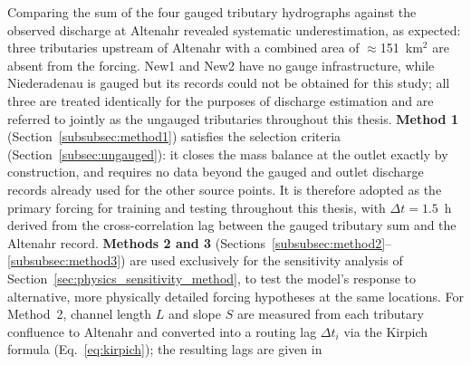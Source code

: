 \documentclass[12pt,a4paper]{report}
\begin{document}
Comparing the sum of the four gauged tributary hydrographs against the observed
discharge at Altenahr revealed systematic underestimation, as expected: three
tributaries upstream of Altenahr with a combined area of $\approx$151~km$^2$ are absent
from the forcing. New1 and New2 have no gauge infrastructure, while Niederadenau is
gauged but its records could not be obtained for this study; all three are treated
identically for the purposes of discharge estimation and are referred to jointly as the
ungauged tributaries throughout this thesis. \textbf{Method 1} (Section~\ref{subsubsec:method1}) satisfies the selection
criteria (Section~\ref{subsec:ungauged}): it closes the mass balance at the outlet
exactly by construction, and requires no data beyond the gauged and outlet discharge
records already used for the other source points. It is therefore adopted as the
primary forcing for training and testing throughout this thesis, with $\Delta t =
1.5$~h derived from the cross-correlation lag between the gauged tributary sum and the
Altenahr record. \textbf{Methods 2 and 3} (Sections~\ref{subsubsec:method2}--\ref{subsubsec:method3})
are used exclusively for the sensitivity analysis of
Section~\ref{sec:physics_sensitivity_method}, to test the
model's response to alternative, more physically detailed forcing hypotheses at the
same locations. For Method~2, channel length $L$ and slope $S$ are measured from each
tributary confluence to Altenahr and converted into a routing lag $\Delta t_i$ via the
Kirpich formula (Eq.~\ref{eq:kirpich}); the resulting lags are given in
\end{document}
